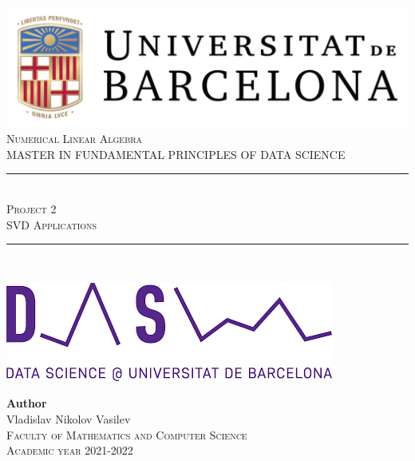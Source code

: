 \documentclass[11pt,a4paper]{article}
\newcommand{\subject}{Numerical Linear Algebra}
\newcommand{\autor}{Vladislav Nikolov Vasilev}
\newcommand{\titulo}{Project 2}
\newcommand{\subtitulo}{SVD Applications}
\newcommand{\masters}{Master in Fundamental Principles of Data Science}
\begin{document}

\begin{titlepage}
  \begin{minipage}{\textwidth}
    \centering
    \includegraphics[scale=0.25]{img/ub-logo}\\[2cm]
    
    \textsc{\Large \subject\\[0.5cm]}
    \textsc{\uppercase\expandafter{\masters}}\\[1.5cm]
    
    \noindent\rule[-1ex]{\textwidth}{1pt}\\[1.5ex]
    \textsc{{\Huge \titulo\\[0.5ex]}}
    \textsc{{\Large \subtitulo\\}}
    \noindent\rule[-1ex]{\textwidth}{2pt}\\[3.5ex]
  \end{minipage}
  
  \vspace{2cm}
  
  \begin{minipage}{\textwidth}
    \centering
    
    \includegraphics[scale=0.4]{img/ub-ds-logo}
    \vspace{2cm}
    
    \textbf{Author}\\ {\autor{}}\\[2.5ex]
    \textsc{Faculty of Mathematics and Computer Science}\\
    \vspace{1em}
    \textsc{Academic year 2021-2022}
  \end{minipage}
\end{titlepage}
\end{document}
